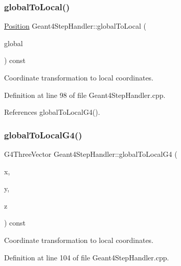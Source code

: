 \subsubsection{\texorpdfstring{global\+To\+Local()}{globalToLocal()}\hspace{0.1cm}{\footnotesize\ttfamily [3/3]}}
{\footnotesize\ttfamily \hyperlink{namespace_d_d4hep_1_1_geometry_a55083902099d03506c6db01b80404900}{Position} Geant4\+Step\+Handler\+::global\+To\+Local (\begin{DoxyParamCaption}\item[{const G4\+Three\+Vector \&}]{global }\end{DoxyParamCaption}) const}



Coordinate transformation to local coordinates. 



Definition at line 98 of file Geant4\+Step\+Handler.\+cpp.



References global\+To\+Local\+G4().

\hypertarget{class_d_d4hep_1_1_simulation_1_1_geant4_step_handler_a2f746a7669e0ab4e52f39e4fbc2cd742}{}\label{class_d_d4hep_1_1_simulation_1_1_geant4_step_handler_a2f746a7669e0ab4e52f39e4fbc2cd742} 
\subsubsection{\texorpdfstring{global\+To\+Local\+G4()}{globalToLocalG4()}\hspace{0.1cm}{\footnotesize\ttfamily [1/2]}}
{\footnotesize\ttfamily G4\+Three\+Vector Geant4\+Step\+Handler\+::global\+To\+Local\+G4 (\begin{DoxyParamCaption}\item[{double}]{x,  }\item[{double}]{y,  }\item[{double}]{z }\end{DoxyParamCaption}) const}



Coordinate transformation to local coordinates. 



Definition at line 104 of file Geant4\+Step\+Handler.\+cpp.



